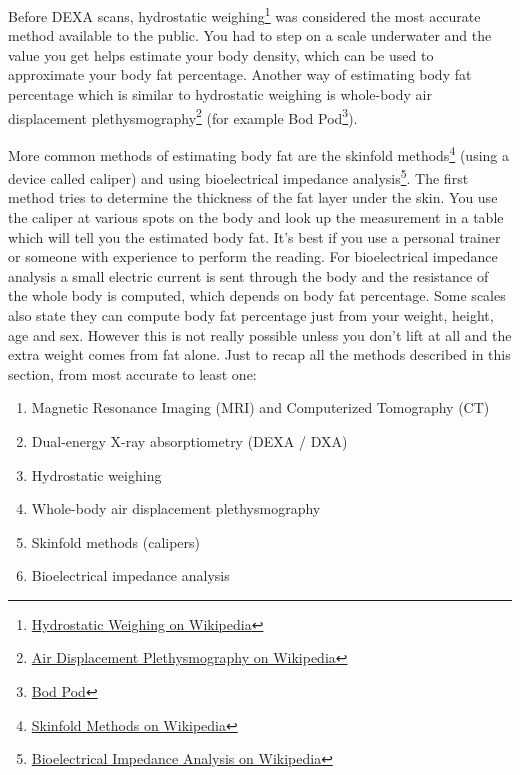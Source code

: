 \documentclass[openany, 12pt]{book}
\begin{document}
	Before DEXA scans, hydrostatic weighing\footnote{\href{https://en.wikipedia.org/wiki/Hydrostatic_weighing}{Hydrostatic Weighing on Wikipedia}} was considered the most accurate method available to the public. You had to step on a scale underwater and the value you get helps estimate your body density, which can be used to approximate your body fat percentage.	Another way of estimating body fat percentage which is similar to hydrostatic weighing is whole-body air displacement plethysmography\footnote{\href{https://en.wikipedia.org/wiki/Air_displacement_plethysmography}{Air Displacement Plethysmography on Wikipedia}} (for example Bod Pod\footnote{\href{https://www.cosmed.com/en/products/body-composition/bod-pod}{Bod Pod}}).
	
	More common methods of estimating body fat are the skinfold methods\footnote{\href{https://en.wikipedia.org/wiki/Body_fat_percentage\#Anthropometric_methods}{Skinfold Methods on Wikipedia}} (using a device called caliper) and using bioelectrical impedance analysis\footnote{\href{https://en.wikipedia.org/wiki/Bioelectrical_impedance_analysis}{Bioelectrical Impedance Analysis on Wikipedia}}. The first method tries to determine the thickness of the fat layer under the skin. You use the caliper at various spots on the body and look up the measurement in a table which will tell you the estimated body fat. It's best if you use a personal trainer or someone with experience to perform the reading. For bioelectrical impedance analysis a small electric current is sent through the body and the resistance of the whole body is computed, which depends on body fat percentage. Some scales also state they can compute body fat percentage just from your weight, height, age and sex. However this is not really possible unless you don't lift at all and the extra weight comes from fat alone. Just to recap all the methods described in this section, from most accurate to least one:
	
	\begin{enumerate}
		\item Magnetic Resonance Imaging (MRI) and Computerized Tomography (CT)
		\item Dual-energy X-ray absorptiometry (DEXA / DXA)
		\item Hydrostatic weighing
		\item Whole-body air displacement plethysmography
		\item Skinfold methods (calipers)
		\item Bioelectrical impedance analysis
	\end{enumerate}
	
\end{document}
